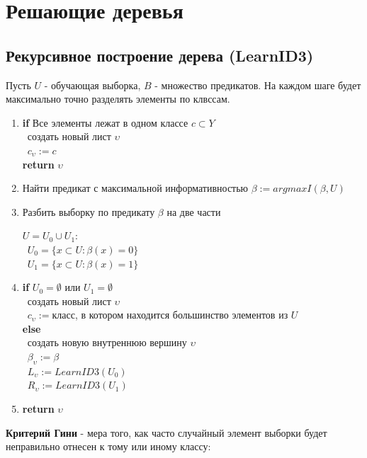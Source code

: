 \documentclass[12pt]{article}
\begin{document}
%

\section{Решающие деревья}
\subsection{Рекурсивное построение дерева (LearnID3)}
Пусть $U$ - обучающая выборка, $B$ - множество предикатов. На каждом шаге будет максимально точно разделять элементы по клвссам.
\begin{enumerate}
\item \textbf{if} Все элементы лежат в одном классе $c\subset Y$\\\
создать новый лист $\upsilon$\\\
$c_\upsilon:=c$\\
\textbf{return} $\upsilon$
\item Найти предикат с максимальной информативностью $\beta:=argmaxI(\beta,U)$
\item Разбить выборку по предикату $\beta$ на две части

$U=U_0 \cup U_1$: \\\
$U_0 = \lbrace x \subset U:\beta(x) = 0 \rbrace $\\\
$U_1 = \lbrace x \subset U:\beta(x) = 1 \rbrace $
\item \textbf{if} $U_0 = \emptyset$ или $U_1 = \emptyset$\\\
	создать новый лист $\upsilon$\\\
	$c_\upsilon:=$класс, в котором находится большинство 			элементов из $U$\\
\textbf{else}\\\
	создать новую внутреннюю вершину $\upsilon$\\\
	$\beta_\upsilon:=\beta$\\\
	$L_\upsilon:=LearnID3(U_0)$\\\
	$R_\upsilon:=LearnID3(U_1)$
\item \textbf{return} $\upsilon$
\end{enumerate}
\textbf{Критерий Гини} - мера того, как часто случайный элемент выборки будет неправильно отнесен к тому или иному классу: 
\end{document}
